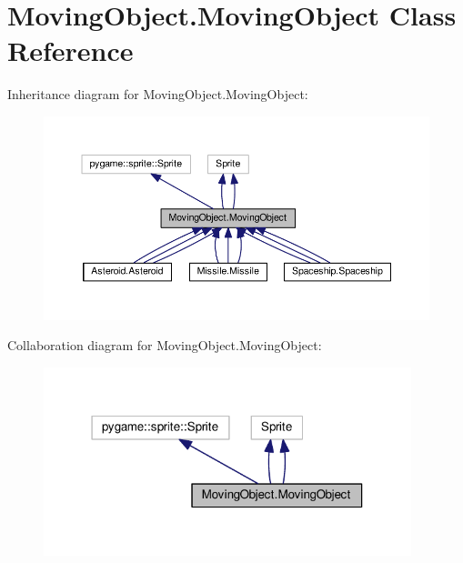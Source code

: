 \hypertarget{classMovingObject_1_1MovingObject}{}\section{Moving\+Object.\+Moving\+Object Class Reference}
\label{classMovingObject_1_1MovingObject}


Inheritance diagram for Moving\+Object.\+Moving\+Object\+:\nopagebreak
\begin{figure}[H]
\begin{center}
\leavevmode
\includegraphics[width=350pt]{classMovingObject_1_1MovingObject__inherit__graph}
\end{center}
\end{figure}


Collaboration diagram for Moving\+Object.\+Moving\+Object\+:\nopagebreak
\begin{figure}[H]
\begin{center}
\leavevmode
\includegraphics[width=303pt]{classMovingObject_1_1MovingObject__coll__graph}
\end{center}
\end{figure}
